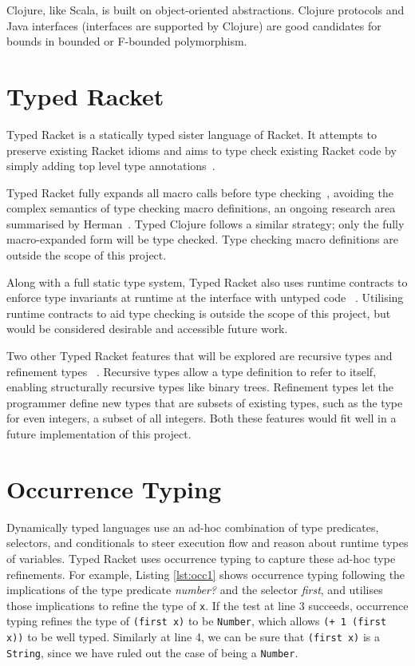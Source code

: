 Clojure, like Scala, is built on object-oriented abstractions. Clojure protocols
and Java interfaces (interfaces are supported by Clojure) are good candidates
for bounds in bounded or F-bounded polymorphism.

\section{Typed Racket}

Typed Racket is a statically typed sister language of Racket. It
attempts to preserve existing Racket idioms and aims to type check
existing Racket code by simply adding top level type annotations~\cite{Tob10}.

Typed Racket fully expands all macro calls before type checking~\cite{Tob10},
avoiding the complex semantics of type checking macro definitions, an ongoing research area summarised
 by Herman~\cite{Her10}.
Typed Clojure follows a similar strategy; only the fully macro-expanded form
will be type checked. Type checking macro definitions are outside the scope of this project.

Along with a full static type system, Typed Racket 
also uses runtime contracts to enforce type invariants at runtime
at the interface with untyped code ~\cite{TF08}.
Utilising runtime contracts to aid type checking is outside the scope of this project, but would be 
considered desirable and accessible future work.

Two other Typed Racket features that will be explored are recursive types and refinement types  
~\cite{Tob10}. Recursive types allow a type definition to refer to itself, enabling structurally
recursive types like binary trees. Refinement types let the programmer define
new types that are subsets of existing types, such as the type for even integers, a subset of all integers.
Both these features would fit well in a future implementation of this project.

\section{Occurrence Typing}
\label{sec:OccurrenceTyping}

Dynamically typed languages use an ad-hoc combination of type predicates,
selectors, and conditionals to steer execution flow and reason about runtime types of variables.
Typed Racket uses occurrence typing to capture these ad-hoc type refinements.
For example, Listing \ref{lst:occ1} shows occurrence typing following the implications 
of the type predicate \emph{number?} and the selector \emph{first}, and utilises those implications to refine
the type of \lstinline|x|. If the test at line 3 succeeds, occurrence typing refines the
type of \lstinline|(first x)| to be \lstinline|Number|, which allows \lstinline|(+ 1 (first x))|
to be well typed. Similarly at line 4, we can be sure that \lstinline|(first x)| is
a \lstinline|String|, since we have ruled out the case of being a \lstinline|Number|.


